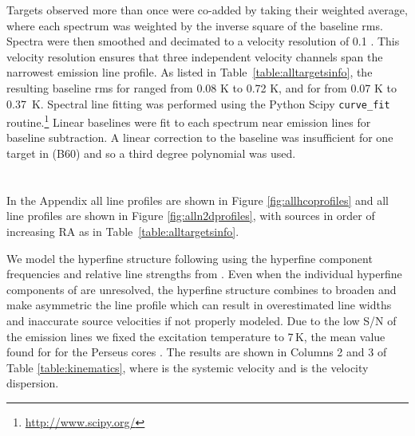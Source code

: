 \documentclass[iop,twocolappendix]{emulateapj}
\begin{document}
Targets observed more than once were co-added by taking their weighted average, where each spectrum was weighted by the inverse square of the baseline rms. Spectra were then smoothed and decimated to a velocity resolution of 0.1 \kms. This velocity resolution ensures that three independent velocity channels span the narrowest emission line profile. As listed in Table~\ref{table:alltargetsinfo}, the resulting baseline rms for {\HCO} ranged from 0.08 K to 0.72 K, and for {\NtD} from 0.07 K to 0.37~K. Spectral line fitting was performed using the Python Scipy {\tt curve\_fit} routine.\footnote{\url{http://www.scipy.org/}} Linear baselines were fit to each spectrum near emission lines for baseline subtraction. A linear correction to the baseline was insufficient for one target in {\HCO} (B60) and so a third degree polynomial was used. 

\section{}
\label{sec:results}

In the Appendix all {\HCO} line profiles are shown in Figure \ref{fig:allhcoprofiles} and all {\NtD} line profiles are shown in Figure \ref{fig:alln2dprofiles}, with sources in order of increasing RA as in Table~\ref{table:alltargetsinfo}.

We model the {\NtD} hyperfine structure following \citet{Friesen2010} using the hyperfine component frequencies and relative line strengths from \citet{Gerin2001}. Even when the individual hyperfine components of {\NtDrot} are unresolved, the hyperfine structure combines to broaden and make asymmetric the line profile which can result in overestimated line widths and inaccurate source velocities if not properly modeled. Due to the low S/N of the {\NtD} emission lines we fixed the excitation temperature to 7\,K, the mean value found for {\NtH} for the Perseus cores \citep{Kirk2007}. The results are shown in Columns 2 and 3 of Table \ref{table:kinematics}, where {\Vthin} is the systemic velocity and {\sigmathin} is the velocity dispersion. 
\end{document}
